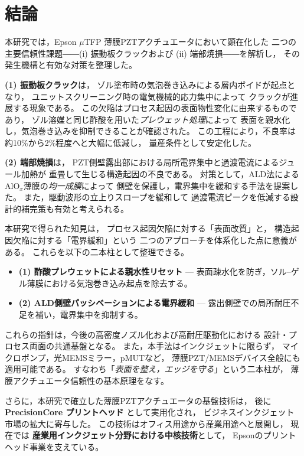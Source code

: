 \documentclass[conference]{IEEEtran}
\begin{document}
\section{結論}
本研究では，Epson $\mu$TFP 薄膜PZTアクチュエータにおいて顕在化した
二つの主要信頼性課題――(i) 振動板クラックおよび (ii) 端部焼損――を解析し，
その発生機構と有効な対策を整理した。

\textbf{(1) 振動板クラック}は，
ゾル塗布時の気泡巻き込みによる層内ボイドが起点となり，
ユニットスクリーニング時の電気機械的応力集中によって
クラックが進展する現象である。
この欠陥はプロセス起因の表面物性変化に由来するものであり，
ゾル溶媒と同じ酢酸を用いた\emph{プレウェット処理}によって
表面を親水化し，気泡巻き込みを抑制できることが確認された。
この工程により，不良率は約10\%から2\%程度へと大幅に低減し，
量産条件として安定化した\cite{Samizo2025}。

\textbf{(2) 端部焼損}は，
PZT側壁露出部における局所電界集中と過渡電流によるジュール加熱が
重畳して生じる構造起因の不良である。
対策として，ALD法によるAlO$_x$薄膜の\emph{均一成膜}によって
側壁を保護し，電界集中を緩和する手法を提案した\cite{TFP2014}。
また，駆動波形の立上りスロープを緩和して
過渡電流ピークを低減する設計的補完策も有効と考えられる。

本研究で得られた知見は，
プロセス起因欠陥に対する「表面改質」と，
構造起因欠陥に対する「電界緩和」という
二つのアプローチを体系化した点に意義がある。
これらを以下の二本柱として整理できる。

\begin{itemize}
  \item \textbf{(1) 酢酸プレウェットによる親水性リセット} —  
  表面疎水化を防ぎ，ソル–ゲル薄膜における気泡巻き込み起点を除去する。
  \item \textbf{(2) ALD側壁パッシベーションによる電界緩和} —  
  露出側壁での局所耐圧不足を補い，電界集中を抑制する。
\end{itemize}

これらの指針は，今後の高密度ノズル化および高耐圧駆動化における
設計・プロセス両面の共通基盤となる。
また，本手法はインクジェットに限らず，
マイクロポンプ，光MEMSミラー，pMUTなど，
薄膜PZT/MEMSデバイス全般にも適用可能である。
すなわち「\emph{表面を整え，エッジを守る}」という二本柱が，
薄膜アクチュエータ信頼性の基本原理をなす。

\vspace{1em}
さらに，本研究で確立した薄膜PZTアクチュエータの基盤技術は，
後に \textbf{PrecisionCore プリントヘッド}\cite{Mach1985,Samizo2025} として実用化され，
ビジネスインクジェット市場の拡大に寄与した。
この技術はオフィス用途から産業用途へと展開し，
現在では \textbf{産業用インクジェット分野における中核技術}として，
Epsonのプリントヘッド事業を支えている。
\end{document}
